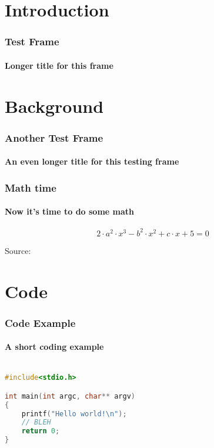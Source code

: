 



\section{Introduction}

\begin{frame}[label=TESTFRAME]
\frametitle{Test Frame}
\framesubtitle{Longer title for this frame}

\lipsum[4]

\end{frame}



\section{Background}

\begin{frame}[label=TESTFRAME2]
\frametitle{Another Test Frame}
\framesubtitle{An even longer title for this testing frame}

\lipsum[4]

\end{frame}


\begin{frame}[label=MATHFRAME]
\frametitle{Math time}
\framesubtitle{Now it's time to do some math}

\lipsum[2]

\begin{equation}
2 \cdot a^{2} \cdot x^{3} - b^{2} \cdot x^{2} + c \cdot x + 5 = 0
\end{equation}

Source: \cite{LaValle}


\end{frame}




\section{Code}

\begin{frame}[fragile,label=CODEFRAME]
\frametitle{Code Example}
\framesubtitle{A short coding example}

\begin{lstlisting}[language=C,basicstyle=\ttfamily]

#include<stdio.h>

int main(int argc, char** argv)
{
    printf("Hello world!\n");
    // BLEH
    return 0;
}

\end{lstlisting}

\end{frame}


